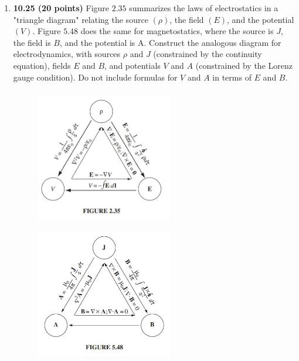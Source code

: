 \documentclass[fleqn]{article}
\begin{document}
\begin{enumerate}
    \pagebreak

    \item \textbf{10.25 (20 points)} Figure $2.35$ summarizes the laws of electrostatics in a "triangle
    diagram" relating the source $(\rho)$, the field $(E)$, and the potential $(V)$. Figure $5.48$
    does the same for magnetostatics, where the source is $J$, the field is $B$, and the
    potential is A. Construct the analogous diagram for electrodynamics, with sources
    $\rho$ and $J$ (constrained by the continuity equation), fields $E$ and $B$, and potentials $V$
    and $A$ (constrained by the Lorenz gauge condition). Do not include formulas for $V$
    and $A$ in terms of $E$ and $B$.
    \begin{figure}[htp]
      \centering
      \includegraphics[height=6cm, width=6cm]{2.JPG}
      \includegraphics[height=6cm, width=6cm]{3.JPG}
    \end{figure}

    
  \end{enumerate}
\end{document}
